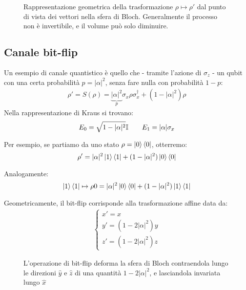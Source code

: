 \documentclass[../../InformazioneQuantistica.tex]{subfiles}
\begin{document}
\begin{figure}[H]
\centering

\caption{Rappresentazione geometrica della trasformazione $\rho\mapsto \rho'$ dal punto di vista dei vettori nella sfera di Bloch. Generalmente il processo non è invertibile, e il volume può solo diminuire.\label{fig:affine}}
\end{figure}

\subsection{Canale bit-flip}
Un esempio di canale quantistico è quello che  - tramite l'azione di $\sigma_z$ - un qubit con una certa probabilità $p=|\alpha|^2$, senza fare nulla con probabilità $1-p$:
\begin{align*}
\rho' = S(\rho) = \underbrace{|\alpha|^2}_{p} \sigma_x \rho \sigma_x^\dag + (1-|\alpha|^2) \rho
\end{align*}
Nella rappresentazione di Kraus si trovano:
\begin{align*}
E_0 = \sqrt{1-|\alpha|^2} \mathbb{I}\qquad E_1 = |\alpha| \sigma_x
\end{align*}

Per esempio, se partiamo da uno stato $\rho = \Ket{0}\Bra{0}$, otterremo:
\begin{align*}
\rho' = |\alpha|^2 \Ket{1}\Bra{1} + (1-|\alpha|^2)\Ket{0}\Bra{0}
\end{align*}

Analogamente:
\begin{align*}
\Ket{1}\Bra{1} \mapsto \rho0 = |\alpha|^2 \Ket{0}\Bra{0} + (1-|\alpha|^2)\Ket{1}\Bra{1}       
\end{align*}

Geometricamente, il bit-flip corrisponde alla trasformazione affine data da:
\begin{align*}
\begin{cases}
x'=x\\
y' = (1-2|\alpha|^2) y\\
z'=(1-2|\alpha|^2)z
\end{cases}
\end{align*}

\begin{figure}[H]
\centering

\caption{L'operazione di bit-flip deforma la sfera di Bloch contraendola lungo le direzioni $\hat{y}$ e $\hat{z}$ di una quantità $1-2|\alpha|^2$, e lasciandola invariata lungo $\hat{x}$\label{fig:bit-flip-geometrica}}
\end{figure}
\end{document}
